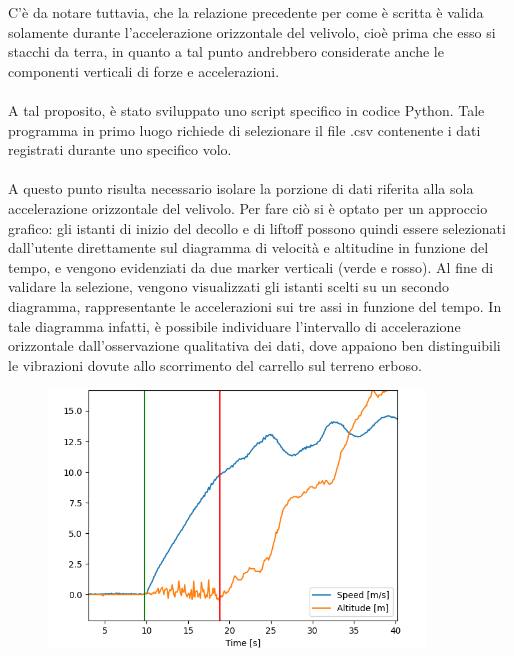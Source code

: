 \documentclass[12pt]{article}
\begin{document}
C'è da notare tuttavia, che la relazione precedente per come è scritta è valida solamente durante l'accelerazione orizzontale del velivolo, cioè prima che esso si stacchi da terra, in quanto a tal punto andrebbero considerate anche le componenti verticali di forze e accelerazioni.
\\\\
\noindent
A tal proposito, è stato sviluppato uno script specifico in codice Python. Tale programma in primo luogo richiede di selezionare il file .csv contenente i dati registrati durante uno specifico volo. 
\\\\
A questo punto risulta necessario isolare la porzione di dati riferita alla sola accelerazione orizzontale del velivolo. Per fare ciò si è optato per un approccio grafico: gli istanti di inizio del decollo e di liftoff possono quindi essere selezionati dall'utente direttamente sul diagramma di velocità e altitudine in funzione del tempo, e vengono evidenziati da due marker verticali (verde e rosso).
Al fine di validare la selezione, vengono visualizzati gli istanti scelti su un secondo diagramma, rappresentante le accelerazioni sui tre assi in funzione del tempo. In tale diagramma infatti, è possibile individuare l'intervallo di accelerazione orizzontale dall'osservazione qualitativa dei dati, dove appaiono ben distinguibili le vibrazioni dovute allo scorrimento del carrello sul terreno erboso.

\begin{figure}[H]
	\centering
	\includegraphics[width=10cm]{img/select-to-1}
\end{figure}

\vspace{-0.5cm}
\end{document}
